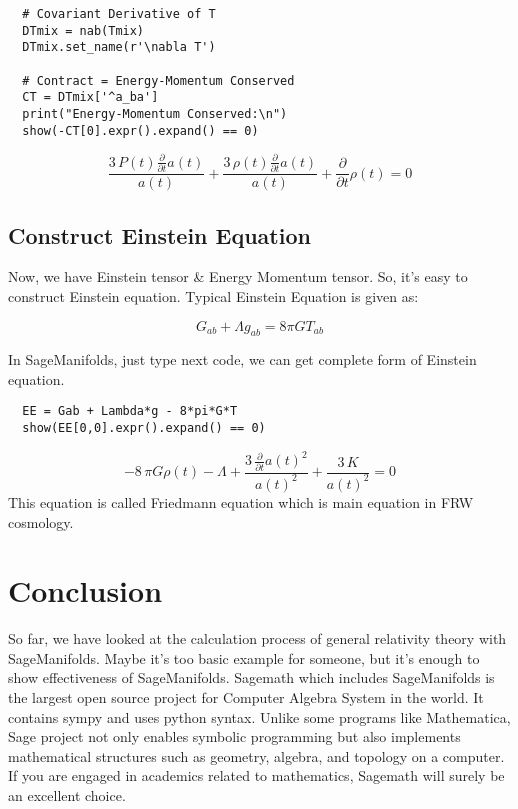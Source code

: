 \documentclass[%
 reprint,
 amsmath,amssymb,
 aps,
]{revtex4-1}
\begin{document}
\begin{lstlisting}
  # Covariant Derivative of T
  DTmix = nab(Tmix)
  DTmix.set_name(r'\nabla T')

  # Contract = Energy-Momentum Conserved
  CT = DTmix['^a_ba']
  print("Energy-Momentum Conserved:\n")
  show(-CT[0].expr().expand() == 0)
\end{lstlisting}
\begin{equation}
  \frac{3 \, P\left(t\right) \frac{\partial}{\partial t}a\left(t\right)}{a\left(t\right)} + \frac{3 \, \rho\left(t\right) \frac{\partial}{\partial t}a\left(t\right)}{a\left(t\right)} + \frac{\partial}{\partial t}\rho\left(t\right) = 0
\end{equation}

\subsection{Construct Einstein Equation}

Now, we have Einstein tensor \& Energy Momentum tensor. So, it's easy to
construct Einstein equation. Typical Einstein Equation is given as:

\begin{equation}
  G_{ab} + \Lambda g_{ab} = 8\pi GT_{ab}
\end{equation}

In SageManifolds, just type next code, we can get complete form of Einstein
equation. 
\begin{lstlisting}
  EE = Gab + Lambda*g - 8*pi*G*T
  show(EE[0,0].expr().expand() == 0)
\end{lstlisting}

\begin{equation}
  -8 \, \pi G \rho\left(t\right) - \Lambda + \frac{3 \, \frac{\partial}{\partial t}a\left(t\right)^{2}}{a\left(t\right)^{2}} + \frac{3 \, K}{a\left(t\right)^{2}} = 0
\end{equation}
This equation is called Friedmann equation which is main equation in FRW cosmology.

\section{Conclusion}

So far, we have looked at the calculation process of general relativity theory
with SageManifolds. Maybe it's too basic example for someone, but it's enough to
show effectiveness of SageManifolds. Sagemath which includes SageManifolds is
the largest open source project for Computer Algebra System in the world. It
contains sympy and uses python syntax. Unlike some programs like Mathematica,
Sage project not only enables symbolic programming but also implements
mathematical structures such as geometry, algebra, and topology on a computer.
If you are engaged in academics related to mathematics, Sagemath will surely be
an excellent choice.
\end{document}
